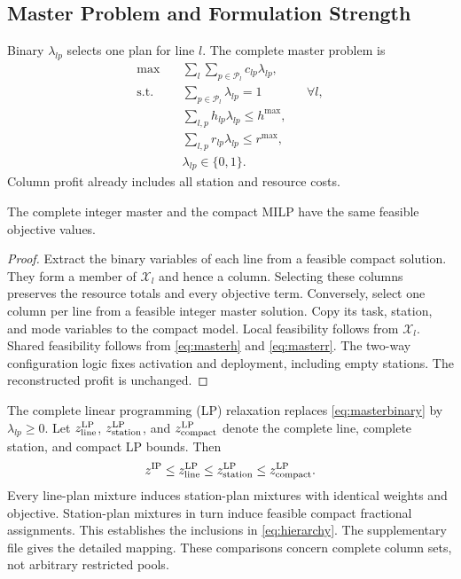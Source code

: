 \subsection{Master Problem and Formulation Strength}
Binary $\lambda_{lp}$ selects one plan for line $l$. The complete master problem is
\begin{align}
\max\quad&\sum_l\sum_{p\in\mathcal P_l}c_{lp}\lambda_{lp},\label{eq:master}\\
\text{s.t.}\quad&\sum_{p\in\mathcal P_l}\lambda_{lp}=1&&\forall l,\label{eq:convex}\\
&\sum_{l,p}h_{lp}\lambda_{lp}\leq h^{\max},\label{eq:masterh}\\
&\sum_{l,p}r_{lp}\lambda_{lp}\leq r^{\max},\label{eq:masterr}\\
&\lambda_{lp}\in\{0,1\}.\label{eq:masterbinary}
\end{align}
Column profit already includes all station and resource costs.

\begin{proposition}\label{prop:equiv}
The complete integer master and the compact MILP have the same feasible objective values.
\end{proposition}
\begin{proof}
Extract the binary variables of each line from a feasible compact solution. They form a member of $\mathcal X_l$ and hence a column. Selecting these columns preserves the resource totals and every objective term. Conversely, select one column per line from a feasible integer master solution. Copy its task, station, and mode variables to the compact model. Local feasibility follows from $\mathcal X_l$. Shared feasibility follows from \eqref{eq:masterh} and \eqref{eq:masterr}. The two-way configuration logic fixes activation and deployment, including empty stations. The reconstructed profit is unchanged.
\end{proof}

The complete linear programming (LP) relaxation replaces \eqref{eq:masterbinary} by $\lambda_{lp}\geq0$. Let $z_{\rm line}^{\mathrm{LP}}$, $z_{\rm station}^{\mathrm{LP}}$, and $z_{\rm compact}^{\mathrm{LP}}$ denote the complete line, complete station, and compact LP bounds. Then
\begin{equation}
z^{\mathrm{IP}}\leq z_{\rm line}^{\mathrm{LP}}\leq z_{\rm station}^{\mathrm{LP}}\leq z_{\rm compact}^{\mathrm{LP}}.\label{eq:hierarchy}
\end{equation}
Every line-plan mixture induces station-plan mixtures with identical weights and objective. Station-plan mixtures in turn induce feasible compact fractional assignments. This establishes the inclusions in \eqref{eq:hierarchy}. The supplementary file gives the detailed mapping. These comparisons concern complete column sets, not arbitrary restricted pools.

